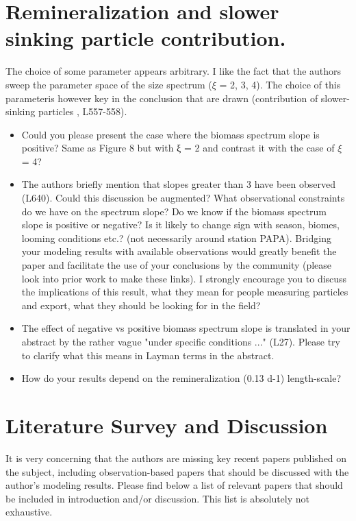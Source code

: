 \documentclass[article,linenumbers]{agujournal2018}
\begin{document}
	\section*{Remineralization and slower sinking particle contribution.}
	The choice of some parameter appears arbitrary. I like the fact that the authors sweep the parameter space of the size spectrum ($\xi$ = 2, 3, 4). The choice of this parameteris however key in the conclusion that are drawn (contribution of slower-sinking particles , L557-558). 
	
	\begin{itemize}
	\item Could you please present the case where the biomass spectrum slope is positive? Same as Figure 8 but with ξ = 2 and contrast it with the case of $\xi$ = 4?
	
	\item The authors briefly mention that slopes greater than 3 have been observed (L640). Could this discussion be augmented? What observational constraints do we have on the spectrum slope? Do we know if the biomass spectrum slope is positive or negative? Is it likely to change sign with season, biomes, looming conditions etc.? (not necessarily around station PAPA). Bridging your modeling results with available observations would greatly benefit the paper and facilitate the use of your conclusions by the community (please look into prior work to make these links). I strongly encourage you to discuss the implications of this result, what they mean for people measuring particles and export, what they should be looking for in the field? 
	
	\item The effect of negative vs positive biomass spectrum slope is translated in your abstract by the rather vague "under specific conditions ..." (L27). Please try to clarify what this means in Layman terms in the abstract.
	
	\item How do your results depend on the remineralization (0.13 d-1) length-scale? 
	\end{itemize}
	
	\section*{Literature Survey and Discussion}
	It is very concerning that the authors are missing key recent papers published on the subject, including observation-based papers that should be discussed with the author's modeling results. Please find below a list of relevant papers that should be included in introduction and/or discussion. This list is absolutely not exhaustive. 
	
\end{document}

